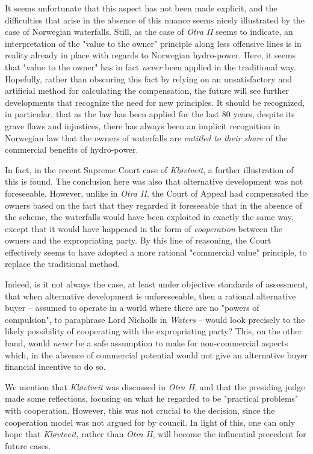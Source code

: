 It seems unfortunate that this aspect has not been made explicit, and the difficulties that arise in the absence of this nuance seems nicely illustrated by the case of Norwegian waterfalls. Still, as the case of \emph{Otra II} seems to indicate, an interpretation of the "value to the owner" principle along less offensive lines is in reality already in place with regards to Norwegian hydro-power. Here, it seems that "value to the owner" has in fact \emph{never} been applied in the traditional way. Hopefully, rather than obscuring this fact by relying on an unsatisfactory and artificial method for calculating the compensation, the future will see further developments that recognize the need for new principles. It should be recognized, in particular, that as the law has been applied for the last 80 years, despite its grave flaws and injustices, there has always been an implicit recognition in Norwegian law that the owners of waterfalls are \emph{entitled to their share} of the commercial benefits of hydro-power. 

In fact, in the recent Supreme Court case of \emph{Kløvtveit}, a further illustration of this is found. The conclusion here was also that alternative development was not foreseeable. However, unlike in \emph{Otra II}, the Court of Appeal had compensated the owners based on the fact that they regarded it foreseeable that in the absence of the scheme, the waterfalls would have been exploited in exactly the same way, except that it would have happened in the form of \emph{cooperation} between the owners and the expropriating party. By this line of reasoning, the Court effectively seems to have adopted a more rational "commercial value" principle, to replace the traditional method. 

Indeed, is it not always the case, at least under objective standards of assessment, that when alternative development is unforeseeable, then a rational alternative buyer -- assumed to operate in a world where there are no "powers of compulsion", to paraphrase Lord Nicholls in \emph{Waters} -- would look precisely to the likely possibility of cooperating with the expropriating party? This, on the other hand, would \emph{never} be a safe assumption to make for non-commercial aspects which, in the absence of commercial potential would not give an alternative buyer financial incentive to do so.

We mention that \emph{Kløvtveit} was discussed in \emph{Otra II}, and that the presiding judge made some reflections, focusing on what he regarded to be "practical problems" with cooperation. However, this was not crucial to the decision, since the cooperation model was not argued for by council. In light of this, one can only hope that \emph{Kløvtveit}, rather than \emph{Otra II}, will become the influential precedent for future cases.

